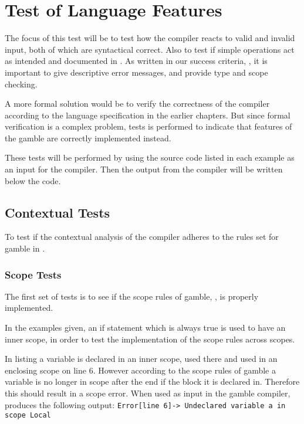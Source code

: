 \section{Test of Language Features}
\label{cha:test_of_language_features}
The focus of this test will be to test how the compiler reacts to valid and invalid input, both of which are syntactical correct.
Also to test if simple operations act as intended and documented in .
As written in our success criteria, , it is important to give descriptive error messages, and provide type and scope checking.

A more formal solution would be to verify the correctness of the compiler according to the language specification in the earlier chapters.
But since formal verification is a complex problem, tests is performed to indicate that features of the \gls{gamble} are correctly implemented instead. \citep{Verification}

These tests will be performed by using the source code listed in each example as an input for the compiler.
Then the output from the compiler will be written below the code.

\subsection*{Contextual Tests}
To test if the contextual analysis of the compiler adheres to the rules set for \gls{gamble} in .

\subsubsection*{Scope Tests}
The first set of tests is to see if the scope rules of \gls{gamble}, , is properly implemented.

In the examples given, an if statement which is always true is used to have an inner scope, in order to test the implementation of the scope rules across scopes.

In listing  a variable is declared in an inner scope, used there and used in an enclosing scope on line 6.
However according to the scope rules of \gls{gamble} a variable is no longer in scope after the end if the block it is declared in.
Therefore this should result in a scope error.
When used as input in the \gls{gamble} compiler,  produces the following output: \texttt{Error[line    6]-> Undeclared variable a in scope Local}

